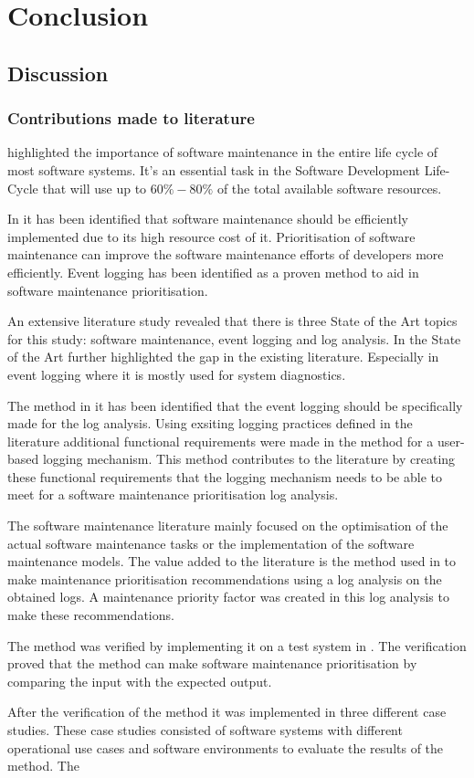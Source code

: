 \chapter{Conclusion}
\label{chap:4}

\section{Discussion}

\subsection{Contributions made to literature}
 highlighted the importance of software maintenance in the entire life cycle of most software systems. It's an essential task in the Software Development Life-Cycle that will use up to $60\%-80\%$ of the total available software resources.\par In  it has been identified that software maintenance should be efficiently implemented due to its high resource cost of it. Prioritisation of software maintenance can improve the software maintenance efforts of developers more efficiently. Event logging has been identified as a proven method to aid in software maintenance prioritisation.\par An extensive literature study revealed that there is three State of the Art topics for this study: software maintenance, event logging and log analysis. In  the State of the Art further highlighted the gap in the existing literature. Especially in event logging where it is mostly used for system diagnostics.\par The method in  it has been identified that the event logging should be specifically made for the log analysis. Using exsiting logging practices defined in the literature additional functional requirements were made in the method for a user-based logging mechanism. This method contributes to the literature by creating these functional requirements that the logging mechanism needs to be able to meet for a software maintenance prioritisation log analysis. \par The software maintenance literature mainly focused on the optimisation of the actual software maintenance tasks or the implementation of the software maintenance models. The value added to the literature is the method used in  to make maintenance prioritisation recommendations using a log analysis on the obtained logs. A maintenance priority factor was created in this log analysis to make these recommendations.\par The method was verified by implementing it on a test system in . The verification proved that the method can make software maintenance prioritisation by comparing the input with the expected output.\par After the verification of the method it was implemented in three different case studies. These case studies consisted of software systems with different operational use cases and software environments to evaluate the results of the method. The 